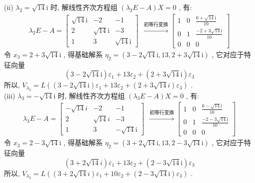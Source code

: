 \documentclass[11pt,a4paper,openany,oneside]{book}
\newcommand{\ii}{\mathrm i}
\begin{document}
(ii) $ \lambda_2=\sqrt{14}\ii $ 时, 解线性齐次方程组 $ (\lambda_2E - A)X = 0 $ , 有:
\begin{gather*}
\lambda_2E - A=
\begin{bmatrix}
\sqrt{14}\ii  &  -2  &  -1  \\
2  &  \sqrt{14}\ii  &  -3  \\
1  &  3  &  \sqrt{14}\ii
\end{bmatrix} \ \ \xrightarrow{\text{初等行变换}}
\begin{bmatrix}
1  &  0  &   \frac{6+\sqrt{14}\ii}{10} \\
0  &  1  &   \frac{-2+3\sqrt{14}\ii}{10} \\
0  &  0  &  0  
\end{bmatrix}
\end{gather*}
令 $ x_3 =2+3\sqrt{14}\ii $ , 得基础解系 $ \eta_2 = (3-2\sqrt{14}\ii,13, 2 +3\sqrt{14}\ii) $ , 它对应于特征向量
 $$ (3-2\sqrt{14}\ii)\varepsilon_1 + 13\varepsilon_2 +( 2 +3\sqrt{14}\ii)\varepsilon_3 $$ 
所以,  $ V_{\lambda_2} = L((3-2\sqrt{14}\ii)\varepsilon_1 + 13\varepsilon_2 +( 2 +3\sqrt{14}i)\varepsilon_3) $ . \\

(iii) $ \lambda_3=-\sqrt{14}\ii $ 时, 解线性齐次方程组 $ (\lambda_3E -A)X=0 $ , 有:
\begin{gather*}
\lambda_3E-A=
\begin{bmatrix}
-\sqrt{14}i  &  -2  &  -1  \\
2  &  \sqrt{14}i  &  -3  \\
1  &  3  &  -\sqrt{14}\ii
\end{bmatrix} \ \ \xrightarrow{\text{初等行变换}}
\begin{bmatrix}
1  &  0  &   \frac{6-\sqrt{14}\ii}{10} \\
0  &  1  &   \frac{-2-3\sqrt{14}\ii}{10} \\
0  &  0  &  0  
\end{bmatrix}
\end{gather*}
令 $ x_3 =2-3\sqrt{14}\ii $ , 得基础解系 $ \eta_2 = (3+2\sqrt{14}\ii,13, 2 - 3\sqrt{14}\ii) $ , 它对应于特征向量
 $$ (3+2\sqrt{14}i)\varepsilon_1 + 13\varepsilon_2 +( 2 -3\sqrt{14}\ii)\varepsilon_3 $$ 
所以,  $ V_{\lambda_3} = L((3+2\sqrt{14}i)\varepsilon_1 + 10\varepsilon_2 +( 2 -3\sqrt{14}\ii)\varepsilon_3) $ . \\  \\  \\
\end{document}
